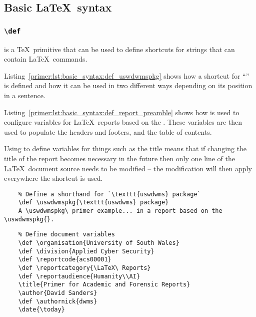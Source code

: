 \subsection{Basic \LaTeX\ syntax}
\subsubsection{\texttt{\textbackslash def}}
 is a \TeX\ primitive that can be used to define shortcuts for strings that can contain \LaTeX\ commands.

Listing~\ref{primer:lst:basic_syntax:def_uswdwmspkg} shows how a shortcut for ``\uswdwmspkg{}'' is defined and how it can be used in two different ways depending on its position in a sentence. %

Listing~\ref{primer:lst:basic_syntax:def_report_preamble} shows how  is used to configure variables for \LaTeX\ reports based on the \uswdwmspkg{}. These variables are then used to populate the headers and footers, and the table of contents.

Using  to define variables for things such as the title means that if changing the title of the report becomes necessary in the future then only one line of the \LaTeX\ document source needs to be modified -- the modification will then apply everywhere the shortcut is used.

\begin{listing}[H]
  \captionsetup{skip=\skiplistingcaptionlen}
  \begin{verbatim}
    % Define a shorthand for `\texttt{uswdwms} package`
    \def \uswdwmspkg{\texttt{uswdwms} package}
    A \uswdwmspkg\ primer example... in a report based on the \uswdwmspkg{}.
  \end{verbatim}
  \caption{\texttt{\textbackslash def \textbackslash uswdwmspkg} command example}
  \label{primer:lst:basic_syntax:def_uswdwmspkg}
\end{listing}
\begin{listing}[H]
  \captionsetup{skip=\skiplistingcaptionlen}
  \begin{verbatim}
    % Define document variables
    \def \organisation{University of South Wales}
    \def \division{Applied Cyber Security}
    \def \reportcode{acs00001}
    \def \reportcategory{\LaTeX\ Reports}
    \def \reportaudience{Humanity\\AI}
    \title{Primer for Academic and Forensic Reports}
    \author{David Sanders}
    \def \authornick{dwms}
    \date{\today}
  \end{verbatim}
  \caption{\texttt{\textbackslash def} report preamble example}
  \label{primer:lst:basic_syntax:def_report_preamble}
\end{listing}

